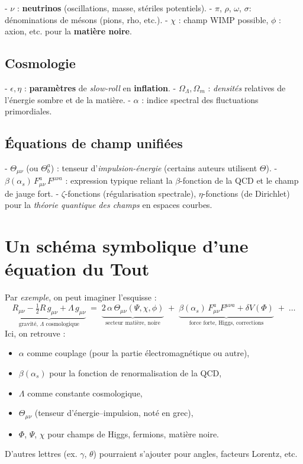 \documentclass[12pt]{article}
\begin{document}
- \(\nu\) : \textbf{neutrinos} (oscillations, masse, stériles potentiels).
- \(\pi\), \(\rho\), \(\omega\), \(\sigma\): dénominations de mésons (pions, rho, etc.).
- \(\chi\) : champ WIMP possible, \(\phi\) : axion, etc. pour la \textbf{matière noire}.

\subsection{Cosmologie}

- \(\epsilon, \eta\) : \textbf{paramètres} de \emph{slow-roll} en \textbf{inflation}.
- \(\Omega_\Lambda, \Omega_m\) : \emph{densités} relatives de l'énergie sombre 
  et de la matière.
- \(\alpha\) : indice spectral des fluctuations primordiales.

\subsection{Équations de champ unifiées}

- \(\Theta_{\mu\nu}\) (ou \(\Theta^a_b\)) : tenseur d'\emph{impulsion-énergie} (certains auteurs utilisent \(\Theta\)).
- \(\beta(\alpha_s)\,F_{\mu\nu}^a\,F^{\mu\nu a}\) : expression typique reliant la \(\beta\)-fonction 
  de la QCD et le champ de jauge fort.
- \(\zeta\)-fonctions (régularisation spectrale), \(\eta\)-fonctions (de Dirichlet) pour 
  la \emph{théorie quantique des champs} en espaces courbes.

\section{Un schéma symbolique d'une équation du Tout}

Par \emph{exemple}, on peut imaginer l'esquisse :
\[
\underbrace{R_{\mu\nu}- \tfrac12 R\,g_{\mu\nu} + \Lambda\,g_{\mu\nu}}_{\text{gravité, }\Lambda\text{ cosmologique}}
\;=\;
\underbrace{2\,\alpha\,\Theta_{\mu\nu}(\Psi,\chi,\phi)}_{\text{secteur matière, noire}}
\;+\;
\underbrace{\beta(\alpha_s)\,F_{\mu\nu}^a F^{\mu\nu a}
+ \delta V(\Phi)}_{\text{force forte, Higgs, corrections}}
\;+\;\ldots
\]
Ici, on retrouve :
\begin{itemize}
    \item \(\alpha\) comme couplage (pour la partie électromagnétique ou autre),
    \item \(\beta(\alpha_s)\) pour la fonction de renormalisation de la QCD,
    \item \(\Lambda\) comme constante cosmologique,
    \item \(\Theta_{\mu\nu}\) (tenseur d'énergie–impulsion, noté en grec),
    \item \(\Phi\), \(\Psi\), \(\chi\) pour champs de Higgs, fermions, matière noire.
\end{itemize}
D'autres lettres (ex. \(\gamma\), \(\theta\)) pourraient s'ajouter pour angles, facteurs Lorentz, etc.
\end{document}
